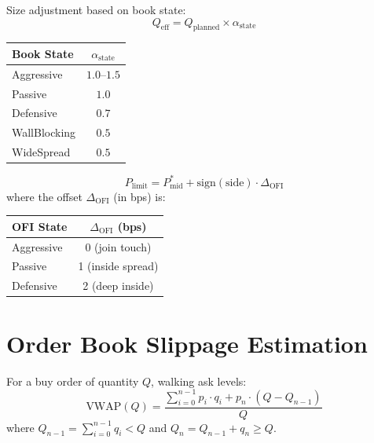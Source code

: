 \documentclass[11pt,a4paper]{article}
\begin{document}
\begin{formulabox}[title={\S8.2 — Effective Quantity}]
Size adjustment based on book state:
\begin{equation}
  Q_{\text{eff}} = Q_{\text{planned}} \times \alpha_{\text{state}}
\end{equation}
\begin{center}
\begin{tabular}{lc}
\toprule
\textbf{Book State} & $\alpha_{\text{state}}$ \\
\midrule
Aggressive  & $1.0$--$1.5$ \\
Passive     & $1.0$ \\
Defensive   & $0.7$ \\
WallBlocking & $0.5$ \\
WideSpread  & $0.5$ \\
\bottomrule
\end{tabular}
\end{center}
\end{formulabox}

\begin{formulabox}[title={\S8.3 — Limit Price with OFI Offset}]
\begin{equation}
  P_{\text{limit}} = P_{\text{mid}}^{*} + \text{sign}(\text{side}) \cdot \Delta_{\text{OFI}}
\end{equation}
where the offset $\Delta_{\text{OFI}}$ (in bps) is:
\begin{center}
\begin{tabular}{lc}
\toprule
\textbf{OFI State} & $\Delta_{\text{OFI}}$ (bps) \\
\midrule
Aggressive & 0 (join touch) \\
Passive    & 1 (inside spread) \\
Defensive  & 2 (deep inside) \\
\bottomrule
\end{tabular}
\end{center}
\end{formulabox}


\section{Order Book Slippage Estimation}

\begin{formulabox}[title={\S9.1 — Buy Slippage Walk}]
For a buy order of quantity $Q$, walking ask levels:
\begin{equation}
  \text{VWAP}(Q) = \frac{\displaystyle\sum_{i=0}^{n-1} p_i \cdot q_i + p_n \cdot (Q - Q_{n-1})}{Q}
\end{equation}
where $Q_{n-1} = \sum_{i=0}^{n-1} q_i < Q$ and $Q_n = Q_{n-1} + q_n \geq Q$.
\end{formulabox}
\end{document}
